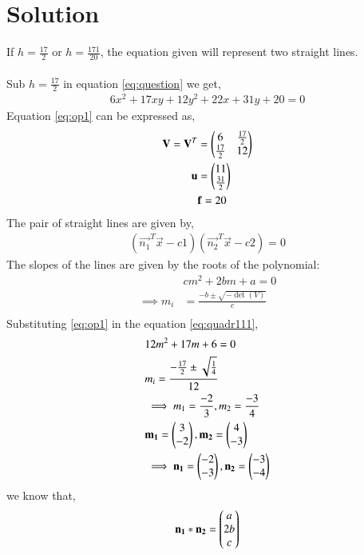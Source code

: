 \documentclass[journal,12pt,twocolumn]{IEEEtran}
\begin{document}
\section{Solution}
If $h=\frac{17}{2}$ or $h=\frac{171}{20}$, the equation given will represent two straight lines.\\
\\
Sub $h=\frac{17}{2}$ in equation \eqref{eq:question} we get,
\begin{align}
6x^2+17xy+12y^2+22x+31y+20=0 \label{eq:op1}
\end{align}
Equation \eqref{eq:op1} can be expressed as,
\begin{align}
\mathbf{V}=\mathbf{V}^T&=\begin{pmatrix}6 & \frac{17}{2} \\ \frac{17}{2} & 12\end{pmatrix} \label{eq:eq1vec}\\
\mathbf{u}&=\begin{pmatrix}11 \\ \frac{31}{2}\end{pmatrix} \label{eq:eq2vec}\\
&\mathbf{f}=20
\end{align}
The pair of straight lines are given by,
\begin{align}
    (\vec{n_1}^{T}\vec{x} - c1)(\vec{n_2}^{T}\vec{x} - c2)=0\label{eq:maineq1}
\end{align}
The slopes of the lines are given by the roots of the polynomial:
\begin{align}
    &cm^2+2bm+a=0 \label{eq:quadr111}\\
    \implies m_i&=\frac{-b\pm{\sqrt{-\det(V)}}}{c}\\
\end{align}
Substituting \eqref{eq:op1} in the equation \eqref{eq:quadr111},
\begin{align}
    &12m^2+17m+6=0 \label{eq:quadr1}\\
    &m_i=\frac{-\frac{17}{2}\pm{\sqrt{\frac{1}{4}}}}{12}\\
    &\implies m_1 = \frac{-2}{3} , m_2 = \frac{-3}{4}\\
    & \mathbf{m_1}=\begin{pmatrix}3\\ -2\end{pmatrix}, \mathbf{m_2}=\begin{pmatrix}4\\ -3\end{pmatrix}\\
    &\implies \mathbf{n_1}=\begin{pmatrix}-2\\ -3\end{pmatrix}, \mathbf{n_2}=\begin{pmatrix}-3\\ -4\end{pmatrix} \label{eq:normal1}
\end{align}
we know that, 
\begin{align}
\mathbf{n_1}\ast \mathbf{n_2} = \begin{pmatrix}a\\2b\\c\end{pmatrix} \label{eq:conv1}
\end{align}
\end{document}
